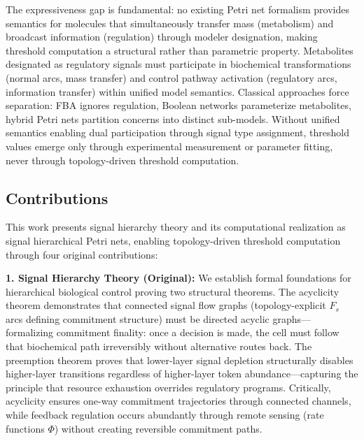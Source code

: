 \documentclass[10pt,letterpaper]{article}
\begin{document}
The expressiveness gap is fundamental: no existing Petri net formalism provides semantics for molecules that simultaneously transfer mass (metabolism) and broadcast information (regulation) through modeler designation, making threshold computation a structural rather than parametric property. Metabolites designated as regulatory signals must participate in biochemical transformations (normal arcs, mass transfer) and control pathway activation (regulatory arcs, information transfer) within unified model semantics. Classical approaches force separation: FBA ignores regulation, Boolean networks parameterize metabolites, hybrid Petri nets partition concerns into distinct sub-models. Without unified semantics enabling dual participation through signal type assignment, threshold values emerge only through experimental measurement or parameter fitting, never through topology-driven threshold computation.

\subsection{Contributions}

This work presents signal hierarchy theory and its computational realization as signal hierarchical Petri nets, enabling topology-driven threshold computation through four original contributions:

\textbf{1. Signal Hierarchy Theory (Original):} We establish formal foundations for hierarchical biological control proving two structural theorems. The acyclicity theorem demonstrates that connected signal flow graphs (topology-explicit $F_s$ arcs defining commitment structure) must be directed acyclic graphs---formalizing commitment finality: once a decision is made, the cell must follow that biochemical path irreversibly without alternative routes back. The preemption theorem proves that lower-layer signal depletion structurally disables higher-layer transitions regardless of higher-layer token abundance---capturing the principle that resource exhaustion overrides regulatory programs. Critically, acyclicity ensures one-way commitment trajectories through connected channels, while feedback regulation occurs abundantly through remote sensing (rate functions $\Phi$) without creating reversible commitment paths.
\end{document}
